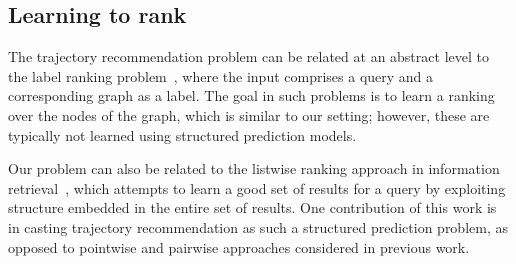 %
\subsection{Learning to rank}


The trajectory recommendation problem can be related at an abstract level to the label ranking problem~\citep{Dekel:2003},
where the input comprises a query and a corresponding graph as a label.
The goal in such problems is to learn a ranking over the nodes of the graph,
which is similar to our setting;
however, these are typically not learned using structured prediction models.

Our problem can also be related to the listwise ranking approach in information retrieval~\citep{Cao:2007},
which attempts to learn a good set of results for a query by exploiting structure embedded in the entire set of results.
One contribution of this work is in casting trajectory recommendation as such a structured prediction problem, as opposed to
pointwise and pairwise approaches considered in previous work.
